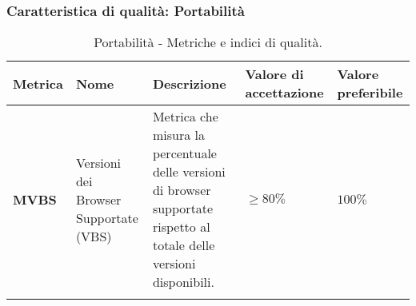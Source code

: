 \subsubsection{Caratteristica di qualità: Portabilità}
\hspace{1pt}
            \begin{longtable}{|C{1.5cm}|L{3cm}|L{4cm}|L{2.5cm}|L{2.5cm}|}
                    \hline
                    \textbf{Metrica} & \textbf{Nome} & \textbf{Descrizione} & \textbf{Valore di accettazione} & \textbf{Valore preferibile} \\
                    \hline
                    \textbf{MVBS} & Versioni dei Browser Supportate (VBS) & Metrica che misura la percentuale delle versioni di browser supportate rispetto al totale delle versioni disponibili. & $\geq 80\%$ & $100\%$ \\
                    \hline
                    \caption{Portabilità - Metriche e indici di qualità.}
                \label{tab:metriche_portabilità_testo}
            \end{longtable}